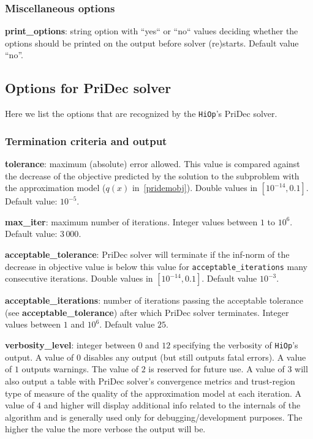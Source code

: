 \documentclass[11pt]{article}
\newcommand{\Hi}{\texttt{HiOp}\xspace}
\begin{document}
\medskip

\subsubsection{Miscellaneous options}

\noindent \textbf{print\_options}: string option with ``yes`` or ``no`` values deciding whether the options should be printed on the output before solver (re)starts. Default value ``no''.


\subsection{Options for PriDec solver}

Here we list the options that are recognized by the \Hi's PriDec solver.
 \subsubsection{Termination criteria and output}

 \noindent \textbf{tolerance}: maximum (absolute) error allowed. This value is compared against the decrease of the objective predicted by the solution to the subproblem with the approximation model ($q(x)$ in~\eqref{pridemobj}). Double values in $[10^{-14},0.1]$. Default value: $10^{-5}$.

  \medskip

  \noindent \textbf{max\_iter}: maximum number of iterations. Integer values between $1$ to $10^6$. Default value: $3\,000$.
  \medskip
  
  \noindent \textbf{acceptable\_tolerance}: PriDec solver will terminate if the inf-norm of the decrease in objective value is below this value for \texttt{acceptable\_iterations} many consecutive iterations. Double values in $[10^{-14},0.1]$. Default value $10^{-3}$.

  \medskip

  \noindent \textbf{acceptable\_iterations}: number of iterations passing the acceptable tolerance (see \textbf{acceptable\_tolerance}) after which PriDec solver terminates. Integer values between $1$ and $10^6$. Default value $25$.

  \medskip

 \noindent \textbf{verbosity\_level}: integer between $0$ and $12$ specifying the verbosity of \Hi's output. A value of $0$ disables any output (but still outputs fatal errors). A value of $1$ outputs warnings. The value of $2$ is reserved for future use. A value of $3$ will also output a table with PriDec solver's convergence metrics and trust-region type of measure of the quality of the approximation model at each iteration. A value of $4$ and higher will display additional info related to the internals of the algorithm and is generally used only for debugging/development purposes. The higher the value the more verbose the output will be.
\end{document}
